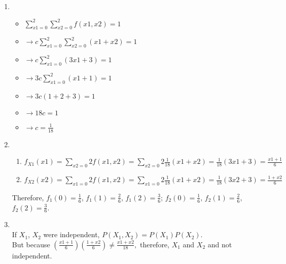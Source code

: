 \documentclass[12pt]{article}%
\begin{document}
\begin{enumerate}
    \color{blue}
    \item {}
    \begin{itemize}
        \item $\sum_{x1=0}^{2} \sum_{x2=0}^{2} f(x1,x2) = 1$
        \item $\rightarrow c \sum_{x1=0}^{2} \sum_{x2=0}^{2} (x1+x2) = 1$
        \item $\rightarrow c \sum_{x1=0}^{2} (3x1+3) = 1$
        \item $\rightarrow 3c \sum_{x1=0}^{2} (x1+1) = 1$
        \item $\rightarrow 3c (1+2+3) = 1$
        \item $\rightarrow 18c = 1$
        \item $\rightarrow c = \frac{1}{18}$
    \end{itemize}
    
    \item {}
    \begin{enumerate}
        \item $f_{X1}(x1) = \sum_{x2=0}{2} f(x1,x2) = \sum_{x2=0}{2} \frac{1}{18}(x1+x2) = \frac{1}{18}(3x1+3) = \frac{x1+1}{6}$
        \item $f_{X2}(x2) = \sum_{x1=0}{2} f(x1,x2) = \sum_{x1=0}{2} \frac{1}{18}(x1+x2) = \frac{1}{18}(3x2+3) = \frac{1+x2}{6}$
    \end{enumerate}
    Therefore, $f_{1}(0)=\frac{1}{6}$, $f_{1}(1)=\frac{2}{6}$, $f_{1}(2)=\frac{3}{6}$; $f_{2}(0)=\frac{1}{6}$, $f_{2}(1)=\frac{2}{6}$, $f_{2}(2)=\frac{3}{6}$.
    
    \pagebreak
    \item {}\\
    If $X_1$, $X_2$ were independent, $P(X_1,X_2)=P(X_1)P(X_2).$\\
    But because $(\frac{x1+1}{6})(\frac{1+x2}{6}) \neq \frac{x1+x2}{18},$
    therefore, $X_1$ and $X_2$ and not independent.
    

\end{enumerate}
\end{document}
